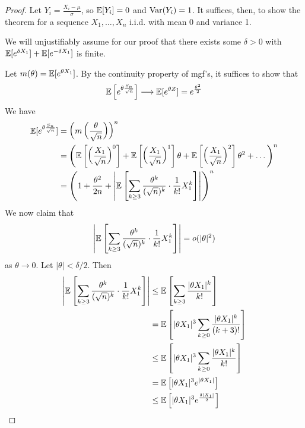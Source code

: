 \documentclass{../template/note}
\begin{document}
    \begin{proof}
        Let \(Y_i = \frac{X_i-\mu}{\sigma}\), so \(\mathbb E[Y_i] = 0\) and \(\operatorname{Var}(Y_i) = 1\). It suffices, then, to show the theorem for a sequence \(X_1, \dots, X_n\) i.i.d. with mean 0 and variance 1.

        We will unjustifiably assume for our proof that there exists some \(\delta > 0\) with \(\mathbb E[e^{\delta X_1}] + \mathbb E[e^{-\delta X_1}]\) is finite.

        Let \(m(\theta) = \mathbb E[e^{\theta X_1}]\). By the continuity property of mgf's, it suffices to show that
        \begin{align*}
            \mathbb E\left[e^{\theta \frac{S_n}{\sqrt n}}\right] \longrightarrow \mathbb E[e^{\theta Z}] = e^{\frac{\theta^2}{2}}
        \end{align*}
        We have
        \begin{align*}
            \mathbb E[e^{\theta \frac{S_n}{\sqrt n}}] &= \left(m\left(\frac{\theta}{\sqrt n}\right)\right)^n \\
            &= \left(\mathbb E\left[\left(\frac{X_1}{\sqrt n}\right)^0\right] + \mathbb E\left[\left(\frac{X_1}{\sqrt n}\right)^1\right]\theta + \mathbb E\left[\left(\frac{X_1}{\sqrt n}\right)^2\right]\theta^2 + \dots\right)^n \\
            &= \left(1 + \frac{\theta^2}{2n} + \left|\mathbb E\left[\sum_{k \geq 3} \frac{\theta^k}{(\sqrt n)^k} \cdot \frac 1{k!} X_1^k\right]\right|\right)^n
        \end{align*}
        We now claim that
        \begin{align*}
            \left|\mathbb E\left[\sum_{k \geq 3} \frac{\theta^k}{(\sqrt n)^k} \cdot \frac 1{k!} X_1^k\right]\right| = o(|\theta|^2)
        \end{align*}
        as \(\theta \to 0\). Let \(|\theta| < \delta/2\). Then
        \begin{align*}
            \left|\EE\left[\sum_{k \geq 3} \frac{\theta^k}{(\sqrt n)^k} \cdot \frac 1{k!} X_1^k\right]\right| &\leq \EE\left[\sum_{k \geq 3} \frac{|\theta X_1|^k}{k!}\right] \\
            &= \EE\left[|\theta X_1|^3 \sum_{k \geq 0} \frac{|\theta X_1|^k}{(k+3)!}\right] \\
            &\leq \EE\left[|\theta X_1|^3 \sum_{k \geq 0} \frac{|\theta X_1|^k}{k!}\right] \\
            &= \EE\left[|\theta X_1|^3 e^{|\theta X_1|}\right] \\
            &\leq \EE\left[|\theta X_1|^3 e^{\frac{\delta|X_1|}{2}}\right]

\end{align*}
\end{proof}
\end{document}
